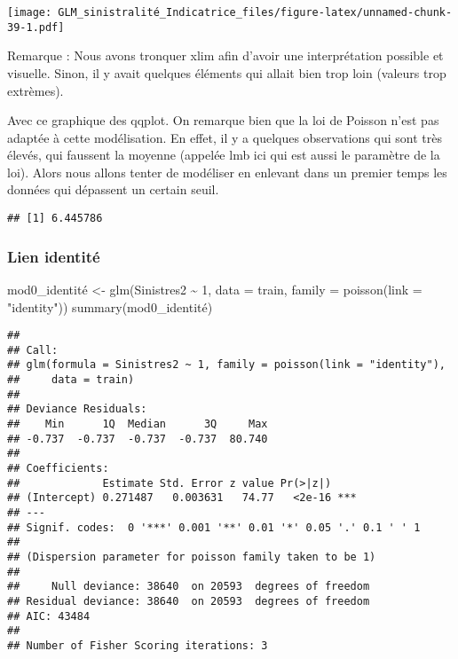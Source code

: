 \documentclass[
]{article}
\newenvironment{Shaded}{\begin{snugshade}}{\end{snugshade}}
\newcommand{\AttributeTok}[1]{\textcolor[rgb]{0.77,0.63,0.00}{#1}}
\newcommand{\DecValTok}[1]{\textcolor[rgb]{0.00,0.00,0.81}{#1}}
\newcommand{\FunctionTok}[1]{\textcolor[rgb]{0.00,0.00,0.00}{#1}}
\newcommand{\NormalTok}[1]{#1}
\newcommand{\OtherTok}[1]{\textcolor[rgb]{0.56,0.35,0.01}{#1}}
\newcommand{\SpecialCharTok}[1]{\textcolor[rgb]{0.00,0.00,0.00}{#1}}
\newcommand{\StringTok}[1]{\textcolor[rgb]{0.31,0.60,0.02}{#1}}
\begin{document}
\texttt{[image: GLM\_sinistralité\_Indicatrice\_files/figure-latex/unnamed-chunk-39-1.pdf]}

Remarque : Nous avons tronquer xlim afin d'avoir une interprétation
possible et visuelle. Sinon, il y avait quelques éléments qui allait
bien trop loin (valeurs trop extrèmes).

Avec ce graphique des qqplot. On remarque bien que la loi de Poisson
n'est pas adaptée à cette modélisation. En effet, il y a quelques
observations qui sont très élevés, qui faussent la moyenne (appelée lmb
ici qui est aussi le paramètre de la loi). Alors nous allons tenter de
modéliser en enlevant dans un premier temps les données qui dépassent un
certain seuil.

\begin{Shaded}
\end{Shaded}

\begin{verbatim}
## [1] 6.445786
\end{verbatim}

\hypertarget{lien-identituxe9}{%
\subsubsection{Lien identité}\label{lien-identituxe9}}

\begin{Shaded}
\begin{Highlighting}[]
\NormalTok{mod0\_identité }\OtherTok{\textless{}{-}} \FunctionTok{glm}\NormalTok{(Sinistres2 }\SpecialCharTok{\textasciitilde{}} \DecValTok{1}\NormalTok{, }\AttributeTok{data =}\NormalTok{ train, }\AttributeTok{family =} \FunctionTok{poisson}\NormalTok{(}\AttributeTok{link =} \StringTok{"identity"}\NormalTok{))}
\FunctionTok{summary}\NormalTok{(mod0\_identité)}
\end{Highlighting}
\end{Shaded}

\begin{verbatim}
## 
## Call:
## glm(formula = Sinistres2 ~ 1, family = poisson(link = "identity"), 
##     data = train)
## 
## Deviance Residuals: 
##    Min      1Q  Median      3Q     Max  
## -0.737  -0.737  -0.737  -0.737  80.740  
## 
## Coefficients:
##             Estimate Std. Error z value Pr(>|z|)    
## (Intercept) 0.271487   0.003631   74.77   <2e-16 ***
## ---
## Signif. codes:  0 '***' 0.001 '**' 0.01 '*' 0.05 '.' 0.1 ' ' 1
## 
## (Dispersion parameter for poisson family taken to be 1)
## 
##     Null deviance: 38640  on 20593  degrees of freedom
## Residual deviance: 38640  on 20593  degrees of freedom
## AIC: 43484
## 
## Number of Fisher Scoring iterations: 3
\end{verbatim}
\end{document}
